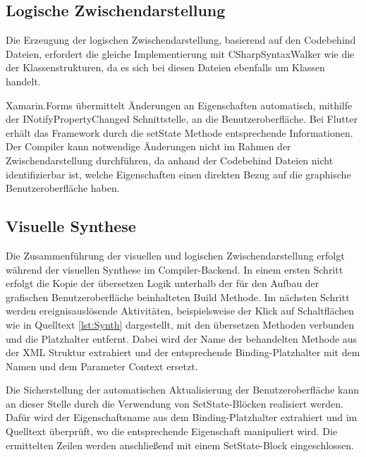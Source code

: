 \subsection{Logische Zwischendarstellung}

Die Erzeugung der logischen Zwischendarstellung,  basierend auf den Codebehind Dateien,  erfordert die gleiche Implementierung mit \glq CSharpSyntaxWalker\grq{} wie die der Klassenstrukturen,  da es sich bei diesen Dateien ebenfalls um \Csharp{} Klassen handelt.  

Xamarin.Forms übermittelt Änderungen an  Eigenschaften automatisch, mithilfe der \glq INotifyPropertyChanged\grq{}  Schnittstelle, an die Benutzeroberfläche.  Bei Flutter erhält das Framework durch die \glq setState\grq{}  Methode entsprechende Informationen.  Der Compiler kann notwendige Änderungen nicht im Rahmen der Zwischendarstellung durchführen, da anhand der Codebehind Dateien nicht identifizierbar ist, welche Eigenschaften einen direkten Bezug auf die graphische Benutzeroberfläche haben. 

\subsection{Visuelle Synthese}

Die Zusammenführung der visuellen und logischen Zwischendarstellung erfolgt während der visuellen Synthese im Compiler-Backend.  In einem ersten Schritt erfolgt die Kopie der übersetzen Logik unterhalb der für den Aufbau der grafischen Benutzeroberfläche beinhalteten \glq Build\grq{} Methode.  Im nächsten Schritt werden ereignisauslösende Aktivitäten,  beispielsweise der Klick auf Schaltflächen wie in Quelltext \ref{lst:Synth} dargestellt,  mit den übersetzen Methoden verbunden und die Platzhalter entfernt.  Dabei wird der Name der behandelten Methode aus der XML Struktur extrahiert und der entsprechende Binding-Platzhalter mit dem Namen und dem Parameter \glq Context\grq{} ersetzt. 


 

Die Sicherstellung der automatischen Aktualisierung der Benutzeroberfläche kann an dieser Stelle durch die Verwendung von SetState-Blöcken realisiert werden.  Dafür wird der Eigenschaftsname aus dem Binding-Platzhalter extrahiert und im Quelltext überprüft, wo die entsprechende Eigenschaft manipuliert wird.  Die ermittelten Zeilen werden anschließend mit einem SetState-Block eingeschlossen.



